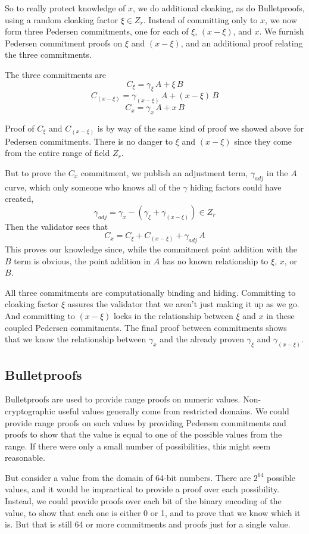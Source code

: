 \documentclass{yellowpaper}
\begin{document}
So to really protect knowledge of $x$, we do additional cloaking, as do Bulletproofs, using a random cloaking factor $\xi \in Z_r$. Instead of committing only to $x$, we now form three Pedersen commitments, one for each of $\xi$, $(x - \xi)$, and $x$. We furnish Pedersen commitment proofs on $\xi$ and $(x-\xi)$, and an additional proof relating the three commitments. 

The three commitments are
$$C_\xi = \gamma_\xi \, A + \xi \, B$$
$$C_{(x-\xi)} = \gamma_{(x-\xi)} \, A + (x - \xi)\, B$$
$$C_x = \gamma_x \, A + x \, B$$

Proof of $C_\xi$ and $C_{(x-\xi)}$ is by way of the same kind of proof we showed above for Pedersen commitments. There is no danger to $\xi$ and $(x - \xi)$ since they come from the entire range of field $Z_r$. 

But to prove the $C_x$ commitment, we publish an adjustment term, $\gamma_{adj}$ in the $A$ curve, which only someone who knows all of the $\gamma$ hiding factors could have created,
$$\gamma_{adj} = \gamma_x - (\gamma_\xi + \gamma_{(x-\xi)}) \in Z_r$$
Then the validator sees that
$$C_x = C_\xi + C_{(x-\xi)} + \gamma_{adj} \, A$$
This proves our knowledge since, while the commitment point addition with the $B$ term is obvious, the point addition in $A$ has no known relationship to $\xi$, $x$, or $B$. 

All three commitments are computationally binding and hiding. Committing to cloaking factor $\xi$ assures the validator that we aren't just making it up as we go. And committing to $(x - \xi)$ locks in the relationship between $\xi$ and $x$ in these coupled Pedersen commitments. The final proof between commitments shows that we know the relationship between $\gamma_x$ and the already proven $\gamma_\xi$ and $\gamma_{(x-\xi)}$. 

\subsection{Bulletproofs}
Bulletproofs are used to provide range proofs on numeric values. Non-cryptographic useful values generally come from restricted domains. We could provide range proofs on such values by providing Pedersen commitments and proofs to show that the value is equal to one of the possible values from the range. If there were only a small number of possibilities, this might seem reasonable.

But consider a value from the domain of 64-bit numbers. There are $2^{64}$ possible values, and it would be impractical to provide a proof over each possibility. Instead, we could provide proofs over each bit of the binary encoding of the value, to show that each one is either 0 or 1, and to prove that we know which it is. But that is still 64 or more commitments and proofs just for a single value.
\end{document}
